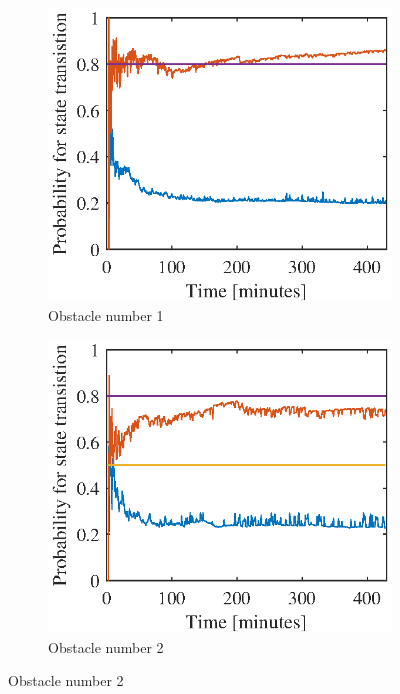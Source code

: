 \begin{figure}[htbp]
	\begin{subfigure}[t]{0.5\linewidth}
		\centering
		\includegraphics[width=1\linewidth]{chapters/appendix/figures/learning_curves/obs1}
		\caption{Obstacle number 1}
	\end{subfigure}
	\hspace*{\fill}
	\begin{subfigure}[t]{0.5\linewidth}
		\centering
		\includegraphics[width=1\linewidth]{chapters/appendix/figures/learning_curves/obs2}
		\caption{Obstacle number 2}
	\end{subfigure}



\end{figure}
